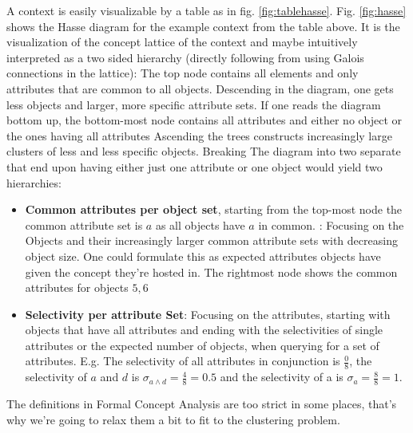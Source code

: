 A context is easily visualizable by a table as in fig. \ref{fig:tablehasse}. Fig. \ref{fig:hasse} shows the Hasse diagram for the example context from the table above. It is the visualization of the concept lattice of the context and maybe intuitively interpreted as a two sided hierarchy (directly following from using Galois connections in the lattice): The top node contains all elements and only attributes that are common to all objects. Descending in the diagram, one gets less objects and larger, more specific attribute sets. If one reads the diagram bottom up, the bottom-most node contains all attributes and either no object or the ones having all attributes Ascending the trees constructs increasingly large clusters of less and less specific objects. Breaking The diagram into two separate that end upon having either just one attribute or one object would yield two hierarchies: 
\begin{itemize}
    \item \textbf{Common attributes per object set}, starting from the top-most node the common attribute set is $a$ as all objects have $a$ in common. : Focusing on the Objects and their increasingly larger common attribute sets with decreasing object size. One could formulate this as expected attributes objects have given the concept they're hosted in. The rightmost node shows the common attributes for objects $5, 6$
    \item \textbf{Selectivity per attribute Set}: Focusing on the attributes, starting with objects that have all attributes and ending with the selectivities of single attributes or the expected number of objects, when querying for a set of attributes.  E.g. The selectivity of all attributes in conjunction is $\frac{0}{8}$, the selectivity of $a$ and $d$ is $\sigma_{a \wedge d} = \frac{4}{8} = 0.5$ and the selectivity of a is $\sigma_a = \frac{8}{8} = 1$.
\end{itemize}


The definitions in Formal Concept Analysis are too strict in some places, that's why we're going to relax them a bit to fit to the clustering problem.~\cite{ignatov2012concept}

